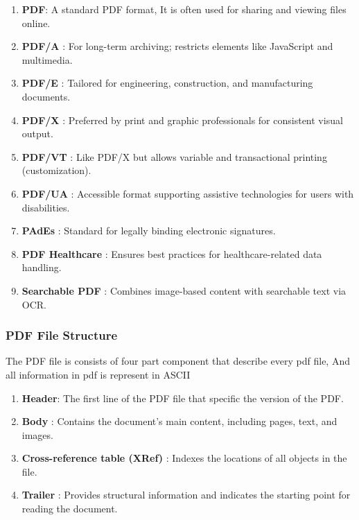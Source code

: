 \documentclass[12pt,oneside,openright,a4paper]{cpe-english-project}
\begin{document}
\begin{enumerate}
	\item \textbf{PDF}: A standard PDF format, It is often used for sharing and viewing files online.
	
	\item \textbf{PDF/A} : For long-term archiving; restricts elements like JavaScript and multimedia.
	
	\item \textbf{PDF/E} : Tailored for engineering, construction, and manufacturing documents.
	
	\item \textbf{PDF/X} : Preferred by print and graphic professionals for consistent visual output.
	
	\item \textbf{PDF/VT} : Like PDF/X but allows variable and transactional printing (customization).
	
	\item \textbf{PDF/UA} : Accessible format supporting assistive technologies for users with disabilities.

	\item \textbf{PAdEs} : Standard for legally binding electronic signatures.

	\item \textbf{PDF Healthcare} : Ensures best practices for healthcare-related data handling.

	\item \textbf{Searchable PDF} : Combines image-based content with searchable text via OCR.

\end{enumerate}

\subsubsection {PDF File Structure}

The PDF file is consists of four part component that describe every pdf file, And all information in pdf is represent in ASCII 

\begin{enumerate}
	\item \textbf{Header}: The first line of the PDF file that specific the version of the PDF.
	\item \textbf{Body} : Contains the document’s main content, including pages, text, and images.
	\item \textbf{Cross-reference table (XRef)} :  Indexes the locations of all objects in the file.
	\item \textbf{Trailer} : Provides structural information and indicates the starting point for reading the document.
\end{enumerate}
\end{document}
